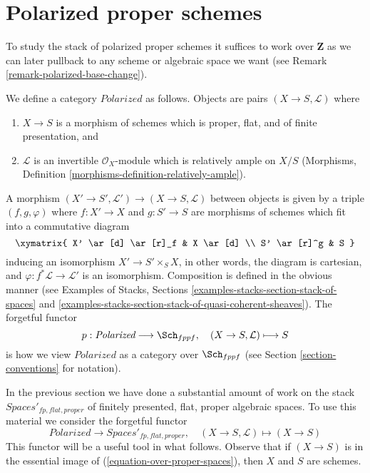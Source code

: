 \section{Polarized proper schemes}
\label{section-polarized}

\noindent
To study the stack of polarized proper schemes it suffices to work
over $\mathbf{Z}$ as we can later pullback to any scheme or algebraic
space we want (see Remark \ref{remark-polarized-base-change}).

\begin{situation}
\label{situation-polarized}
We define a category $\textit{Polarized}$ as follows. Objects are
pairs $(X \to S, \mathcal{L})$ where
\begin{enumerate}
\item $X \to S$ is a morphism of schemes which is proper, flat, and
of finite presentation, and
\item $\mathcal{L}$ is an invertible $\mathcal{O}_X$-module
which is relatively ample on $X/S$
(Morphisms, Definition \ref{morphisms-definition-relatively-ample}).
\end{enumerate}
A morphism $(X' \to S', \mathcal{L}') \to (X \to S, \mathcal{L})$
between objects
is given by a triple $(f, g, \varphi)$ where $f : X' \to X$ and $g : S' \to S$
are morphisms of schemes which fit into a commutative diagram
$$
\xymatrix{
X' \ar[d] \ar[r]_f & X \ar[d] \\
S' \ar[r]^g & S
}
$$
inducing an isomorphism $X' \to S' \times_S X$, in other words, the
diagram is cartesian,
and $\varphi : f^*\mathcal{L} \to \mathcal{L}'$ is an isomorphism.
Composition is defined in the obvious manner (see
Examples of Stacks, Sections
\ref{examples-stacks-section-stack-of-spaces} and
\ref{examples-stacks-section-stack-of-quasi-coherent-sheaves}).
The forgetful functor
$$
p : \textit{Polarized} \longrightarrow \Sch_{fppf},\quad
(X \to S, \mathcal{L}) \longmapsto S
$$
is how we view $\textit{Polarized}$ as a category over $\Sch_{fppf}$
(see Section \ref{section-conventions} for notation).
\end{situation}

\noindent
In the previous section we have done a substantial amount of work on the stack
$\textit{Spaces}'_{fp, flat, proper}$
of finitely presented, flat, proper algebraic spaces. To use this material
we consider the forgetful functor
\begin{equation}
\label{equation-over-proper-spaces}
\textit{Polarized} \longrightarrow
\textit{Spaces}'_{fp, flat, proper},\quad
(X \to S, \mathcal{L}) \longmapsto (X \to S)
\end{equation}
This functor will be a useful tool in what follows.
Observe that if $(X \to S)$ is in the essential image
of (\ref{equation-over-proper-spaces}), then
$X$ and $S$ are schemes.

